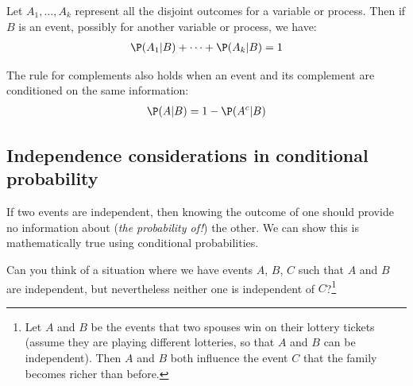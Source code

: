 

\begin{termBox}{
Let $A_1,\dots,A_k$ represent all the disjoint outcomes for a variable or process. Then if $B$ is an event, possibly for another variable or process, we have: \vspace{-1mm}
\begin{eqnarray*}
\P(A_1|B)+\cdots+\P(A_k|B) = 1
\end{eqnarray*}\vspace{-5.5mm} \par
The rule for complements also holds when an event and its complement are conditioned on the same information: \vspace{-1.5mm}
\begin{eqnarray*}
\P(A | B) = 1 - \P(A^c | B)
\end{eqnarray*}}
\end{termBox}

\subsection{Independence considerations in conditional probability}

If two events are independent, then knowing the outcome of one should provide no information about (\emph{the probability of!}) the other. We can show this is mathematically true using conditional probabilities.

\begin{exercise}
	Can you think of a situation where we have events $A$, $B$, $C$ such that $A$ and $B$ are independent, but nevertheless neither one is independent of $C$?\footnote{Let $A$ and $B$ be the events that two spouses win on their lottery tickets (assume they are playing different lotteries, so that $A$ and $B$ can be independent). Then $A$ and $B$ both influence the event $C$ that the family becomes richer than before.}
\end{exercise}

